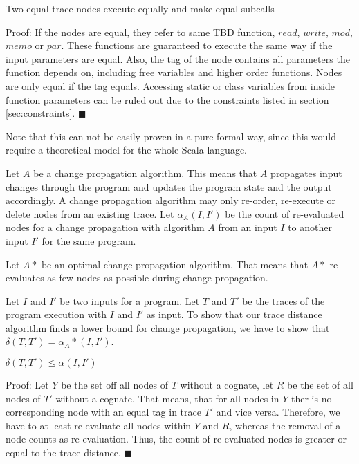 \begin{lemma}
\label{lem:equalExec}
Two equal trace nodes execute equally and make equal subcalls
\end{lemma}

Proof: If the nodes are equal, they refer to same TBD function, $read$, $write$, $mod$, $memo$ or $par$. These functions are guaranteed to execute the same way if the input parameters are equal. Also, the tag of the node contains all parameters the function depends on, including free variables and higher order functions. Nodes are only equal if the tag equals. Accessing static or class variables from inside function parameters can be ruled out due to the constraints listed in section \ref{sec:constraints}. $\blacksquare$

Note that this can not be easily proven in a pure formal way, since this would require a theoretical model for the whole Scala language. 

\begin{definition}
Let $A$ be a change propagation algorithm. This means that $A$ propagates input changes through the program and updates the program state and the output accordingly. A change propagation algorithm may only re-order, re-execute or delete nodes from an existing trace. 
Let $\alpha_A(I, I')$ be the count of re-evaluated nodes for a change propagation with algorithm $A$ from an input $I$ to another input $I'$ for the same program. 
\end{definition}

\begin{definition}
Let $A*$ be an optimal change propagation algorithm. That means that $A*$ re-evaluates as few nodes as possible during change propagation. 
\end{definition}

Let $I$ and $I'$ be two inputs for a program. Let $T$ and $T'$ be the traces of the program execution with $I$ and $I'$ as input. 
To show that our trace distance algorithm finds a lower bound for change propagation, we have to show that $\delta(T, T') = \alpha_A*(I, I')$. 

\begin{lemma}
\label{lem:alphaLeq}
$\delta(T, T') \leq \alpha(I, I')$
\end{lemma} 
Proof: Let $Y$ be the set off all nodes of $T$ without a cognate, let $R$ be the set of all nodes of $T'$ without a cognate. 
That means, that for all nodes in $Y$ ther is no corresponding node with an equal tag in trace $T'$ and vice versa. Therefore, we have to at least re-evaluate all nodes within $Y$ and $R$, whereas the removal of a node counts as re-evaluation. Thus, the count of re-evaluated nodes is greater or equal to the trace distance. $\blacksquare$

